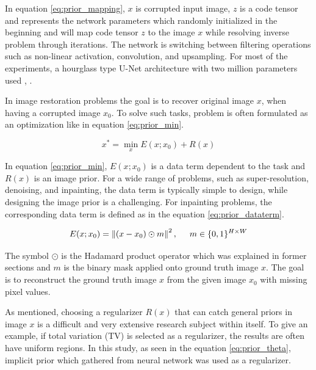 In equation \ref{eq:prior_mapping}, \(x\) is corrupted input image, \(z\) is a code tensor and  represents the network parameters which randomly initialized in the beginning and will map code tensor \(z\) to the image \(x\) while resolving inverse problem through iterations. The network is switching between filtering operations such as non-linear activation, convolution, and upsampling. For most of the experiments, a hourglass type U-Net architecture with two million parameters used \cite{deep_image_prior}, \cite{hourglass}.

In image restoration problems the goal is to recover original image \(x\), when having a corrupted image \(x_{0}\). To solve such tasks, problem is often formulated as an optimization like in equation \ref{eq:prior_min}.

\begin{equation}
    x^{\ast} = \min_{x} E(x;x_{0}) + R(x)
    \label{eq:prior_min}
\end{equation}

In equation \ref{eq:prior_min}, \(E(x;x_{0})\) is a data term dependent to the task and \(R(x)\) is an image prior. For a wide range of problems, such as super-resolution, denoising, and inpainting, the data term is typically simple to design, while designing the image prior is a challenging. For inpainting problems, the corresponding data term is defined as in the equation \ref{eq:prior_dataterm}.

\begin{equation}
    E(x;x_{0}) = \left \| (x - x_{0}) \odot m \right \|^{2} , \hspace{5mm} m \in \{0, 1\}^{H \times W}
    \label{eq:prior_dataterm}
\end{equation}

The symbol \(\odot\) is the Hadamard product operator which was explained in former sections and \(m\) is the binary mask applied onto ground truth image \(x\). The goal is to reconstruct the ground truth image \(x\) from the given image \(x_{0}\)  with missing pixel values.

As mentioned, choosing a regularizer \(R(x)\) that can catch general priors in image \(x\) is a difficult and very extensive research subject within itself. To give an example, if total variation (TV) \cite{deep_inverting} is selected as a regularizer, the results are often have uniform regions. In this study, as seen in the equation \ref{eq:prior_theta}, implicit prior which gathered from neural network was used as a regularizer.

